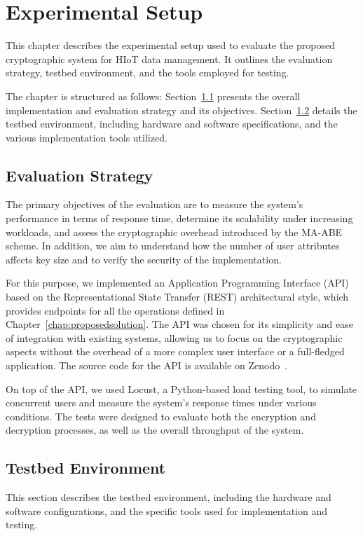 \documentclass[cic,tc,english]{iiufrgs}
\numberwithin{algorithm}{chapter}
\begin{document}
\chapter{Experimental Setup}
\label{chap:experimentalsetup}

    This chapter describes the experimental setup used to evaluate the proposed cryptographic system for HIoT data management. It outlines the evaluation strategy, testbed environment, and the tools employed for testing.

    The chapter is structured as follows: Section~\ref{sec:evaluation-strategy} presents the overall implementation and evaluation strategy and its objectives. Section~\ref{sec:testbed} details the testbed environment, including hardware and software specifications, and the various implementation tools utilized.

    \section{Evaluation Strategy}
        \label{sec:evaluation-strategy}
        The primary objectives of the evaluation are to measure the system's performance in terms of response time, determine its scalability under increasing workloads, and assess the cryptographic overhead introduced by the MA-ABE scheme. In addition, we aim to understand how the number of user attributes affects key size and to verify the security of the implementation.

        For this purpose, we implemented an Application Programming Interface (API) based on the Representational State Transfer (REST) architectural style, which provides endpoints for all the operations defined in Chapter~\ref{chap:proposedsolution}. The API was chosen for its simplicity and ease of integration with existing systems, allowing us to focus on the cryptographic aspects without the overhead of a more complex user interface or a full-fledged application. The source code for the API is available on Zenodo~\citep{maabeflask}.

        On top of the API, we used Locust, a Python-based load testing tool, to simulate concurrent users and measure the system's response times under various conditions. The tests were designed to evaluate both the encryption and decryption processes, as well as the overall throughput of the system.

    \section{Testbed Environment}
        \label{sec:testbed}
        This section describes the testbed environment, including the hardware and software configurations, and the specific tools used for implementation and testing.
\end{document}
